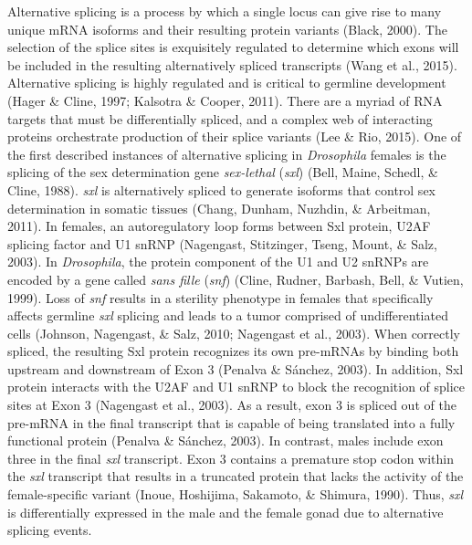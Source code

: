 \documentclass[12pt,twoside]{reedthesis}
\begin{document}
Alternative splicing is a process by which a single locus can give rise
to many unique mRNA isoforms and their resulting protein variants
(Black, 2000). The selection of the splice sites is exquisitely
regulated to determine which exons will be included in the resulting
alternatively spliced transcripts (Wang et al., 2015). Alternative splicing
is highly regulated and is critical to germline development
(Hager \& Cline, 1997; Kalsotra \& Cooper, 2011). There are a myriad of RNA targets that
must be differentially spliced, and a complex web of interacting
proteins orchestrate production of their splice variants (Lee \& Rio, 2015).
One of the first described instances of alternative splicing in
\emph{Drosophila} females is the splicing of the sex determination gene
\emph{sex-lethal} (\emph{sxl}) (Bell, Maine, Schedl, \& Cline, 1988). \emph{sxl} is alternatively spliced to
generate isoforms that control sex determination in somatic tissues
(Chang, Dunham, Nuzhdin, \& Arbeitman, 2011). In females, an autoregulatory loop forms between Sxl
protein, U2AF splicing factor and U1 snRNP (Nagengast, Stitzinger, Tseng, Mount, \& Salz, 2003). In
\emph{Drosophila}, the protein component of the U1 and U2 snRNPs are encoded
by a gene called \emph{sans fille} (\emph{snf}) (Cline, Rudner, Barbash, Bell, \& Vutien, 1999). Loss of \emph{snf}
results in a sterility phenotype in females that specifically affects
germline \emph{sxl} splicing and leads to a tumor comprised of
undifferentiated cells (Johnson, Nagengast, \& Salz, 2010; Nagengast et al., 2003). When
correctly spliced, the resulting Sxl protein recognizes its own
pre-mRNAs by binding both upstream and downstream of Exon 3
(Penalva \& Sánchez, 2003). In addition, Sxl protein interacts with the U2AF and
U1 snRNP to block the recognition of splice sites at Exon 3
(Nagengast et al., 2003). As a result, exon 3 is spliced out of the pre-mRNA
in the final transcript that is capable of being translated into a fully
functional protein (Penalva \& Sánchez, 2003). In contrast, males include exon
three in the final \emph{sxl} transcript. Exon 3 contains a premature stop
codon within the \emph{sxl} transcript that results in a truncated protein
that lacks the activity of the female-specific variant (Inoue, Hoshijima, Sakamoto, \& Shimura, 1990).
Thus, \emph{sxl} is differentially expressed in the male and the female gonad
due to alternative splicing events.
\end{document}
